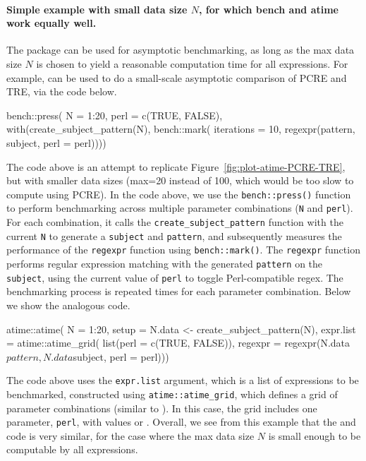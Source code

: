 \paragraph{Simple example with small data size $N$, for which bench and atime work equally well.}
The  package can be used for asymptotic benchmarking, as long as the max data size $N$ is chosen to yield a reasonable computation time for all expressions.
For example,  can be used to do a small-scale asymptotic comparison of PCRE and TRE, via the code below. 
\begin{Schunk}
\begin{Sinput}
bench::press(
  N = 1:20,
  perl = c(TRUE, FALSE),
  with(create_subject_pattern(N), bench::mark(
    iterations = 10,
    regexpr(pattern, subject, perl = perl))))
\end{Sinput}
\end{Schunk}
The code above is an attempt to replicate Figure~\ref{fig:plot-atime-PCRE-TRE}, but with smaller data sizes (max=20 instead of 100, which would be too slow to compute using PCRE).
In the code above, we use the \texttt{bench::press()} function to perform benchmarking across multiple parameter combinations (\texttt{N} and \texttt{perl}).
For each combination, it calls the \texttt{create\_subject\_pattern} function with the current \texttt{N} to generate a \texttt{subject} and \texttt{pattern}, and subsequently measures the performance of the \texttt{regexpr} function using \texttt{bench::mark()}. The \texttt{regexpr} function performs regular expression matching with the generated \texttt{pattern} on the \texttt{subject}, using the current value of \texttt{perl} to toggle Perl-compatible regex. 
The benchmarking process is repeated  times for each parameter combination.
Below we show the analogous  code. 
\begin{Schunk}
\begin{Sinput}
atime::atime(
  N = 1:20,
  setup = N.data <- create_subject_pattern(N),
  expr.list = atime::atime_grid(
    list(perl = c(TRUE, FALSE)),
    regexpr = regexpr(N.data$pattern, N.data$subject, perl = perl)))
\end{Sinput}
\end{Schunk}
The code above uses the \texttt{expr.list} argument, which is a list of expressions to be benchmarked, constructed using \texttt{atime::atime\_grid}, which defines a grid of parameter combinations (similar to ). 
In this case, the grid includes one parameter, \texttt{perl}, with values  or . 
Overall, we see from this example that the  and  code is very similar, for the case where the max data size $N$ is small enough to be computable by all expressions.



